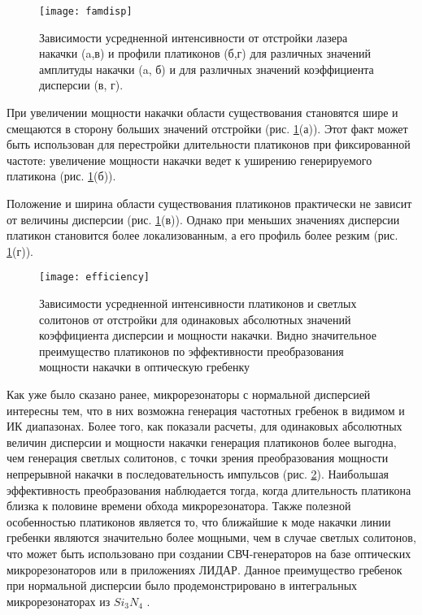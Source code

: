 \begin{figure}
  \centering
  \texttt{[image: famdisp]}
  \caption{Зависимости усредненной интенсивности от отстройки лазера накачки (a,в) и профили платиконов (б,г) для различных значений амплитуды накачки (a, б) и для различных значений коэффициента дисперсии (в, г).} \label{platicons_famdisp}
\end{figure}

При увеличении мощности накачки области существования становятся шире и смещаются в сторону больших значений отстройки (рис. \ref{platicons_famdisp}(а)). Этот факт может быть использован для перестройки длительности платиконов при фиксированной частоте: увеличение мощности накачки ведет к уширению генерируемого платикона (рис. \ref{platicons_famdisp}(б)).

Положение и ширина области существования платиконов практически не зависит от величины дисперсии (рис. \ref{platicons_famdisp}(в)). Однако при меньших значениях дисперсии платикон становится более локализованным, а его профиль более резким (рис. \ref{platicons_famdisp}(г)).

\begin{figure}
  \centering
  \texttt{[image: efficiency]}
  \caption{Зависимости усредненной интенсивности платиконов и светлых солитонов от отстройки для одинаковых абсолютных значений коэффициента дисперсии и мощности накачки. Видно значительное преимущество платиконов по эффективности преобразования мощности накачки в оптическую гребенку} \label{platicons_efficiency}
\end{figure}

Как уже было сказано ранее, микрорезонаторы с нормальной дисперсией интересны тем, что в них возможна генерация частотных гребенок в видимом и ИК диапазонах. Более того, как показали расчеты, для одинаковых абсолютных величин дисперсии и мощности накачки генерация платиконов более выгодна, чем генерация светлых солитонов, с точки зрения преобразования мощности непрерывной накачки в последовательность импульсов (рис. \ref{platicons_efficiency}). Наибольшая эффективность преобразования наблюдается тогда, когда длительность платикона близка к половине времени обхода микрорезонатора. Также полезной особенностью платиконов является то, что ближайшие к моде накачки линии гребенки являются значительно более мощными, чем в случае светлых солитонов, что может быть использовано при создании СВЧ-генераторов на базе оптических микрорезонаторов или в приложениях ЛИДАР. Данное преимущество гребенок при нормальной дисперсии было продемонстрировано в интегральных микрорезонаторах из $Si_3N_4$ \cite{Xue2017}.


